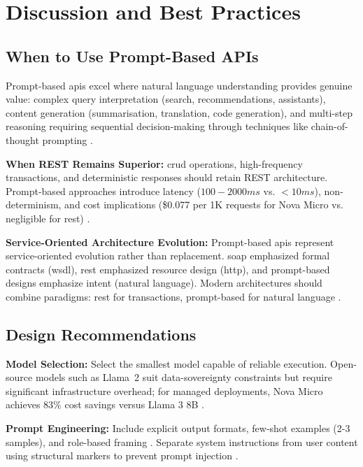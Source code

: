 \section{Discussion and Best Practices}

\subsection{When to Use Prompt-Based APIs}

Prompt-based \gls{api}s excel where natural language understanding provides genuine value: complex query interpretation (search, recommendations, assistants), content generation (summarisation, translation, code generation), and multi-step reasoning requiring sequential decision-making through techniques like chain-of-thought prompting \cite{brown_language_2020, schluntz_building_2024, wei_chainofthought_2022}.

\textbf{When REST Remains Superior:} \gls{crud} operations, high-frequency transactions, and deterministic responses should retain REST architecture. Prompt-based approaches introduce latency ($100-2000ms$ vs. $<10ms$), non-determinism, and cost implications (\$0.077 per 1K requests for Nova Micro vs. negligible for \gls{rest}) \cite{aws_bedrock_2025}.

\textbf{Service-Oriented Architecture Evolution:} Prompt-based \gls{api}s represent service-oriented evolution rather than replacement. \gls{soap} emphasized formal contracts (\gls{wsdl}), \gls{rest} emphasized resource design (\gls{http}), and prompt-based designs emphasize intent (natural language). Modern architectures should combine paradigms: \gls{rest} for transactions, prompt-based for natural language \cite{lercher_managing_2024}.

\subsection{Design Recommendations}

\textbf{Model Selection:} Select the smallest model capable of reliable execution. Open-source models such as Llama~2 \cite{touvron_llama_2023} suit data-sovereignty constraints but require significant infrastructure overhead; for managed deployments, Nova Micro achieves 83\% cost savings versus Llama 3 8B \cite{aws_nova_2025}.

\textbf{Prompt Engineering:} Include explicit output formats, few-shot examples (2-3 samples), and role-based framing \cite{chen_prompt_2025}. Separate system instructions from user content using structural markers to prevent prompt injection \cite{owasp_top_2024, schluntz_building_2024}.

